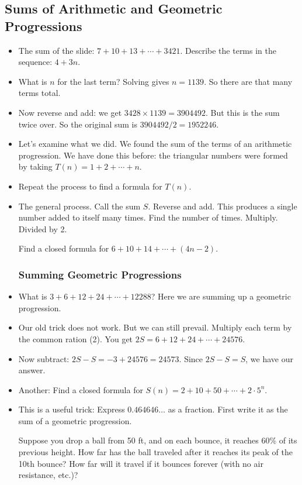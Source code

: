 \subsection*{Sums of Arithmetic and Geometric Progressions}
\begin{itemize}
\item The sum of the slide: $7 + 10 + 13 + \cdots + 3421$.  Describe the terms in the sequence: $4 + 3n$.  
\item What is $n$ for the last term?  Solving gives $n = 1139$.  So there are that many terms total.  
\item Now reverse and add: we get $3428\times 1139 = 3904492$.  But this is the sum twice over.  So the original sum is $3904492/2 = 1952246$.
\item Let's examine what we did.  We found the sum of the terms of an arithmetic progression.  We have done this before: the triangular numbers were formed by taking $T(n) = 1 + 2 + \cdots + n$.
\item Repeat the process to find a formula for $T(n)$.  
\item The general process.  Call the sum $S$.  Reverse and add.  This produces a single number added to itself many times.  Find the number of times.  Multiply.  Divided by 2.

 Find a closed formula for $6 + 10 + 14 + \cdots + (4n - 2)$.

\subsubsection*{Summing Geometric Progressions}

\item What is $3 + 6 + 12 + 24 + \cdots + 12288$?  Here we are summing up a geometric progression.
\item Our old trick does not work.  But we can still prevail.  Multiply each term by the common ration (2).  You get $2S = 6 + 12 + 24 + \cdots + 24576$.  
\item Now subtract: $2S - S = -3 + 24576 = 24573$.  Since $2S - S = S$, we have our answer.
\item Another: Find a closed formula for $S(n) = 2 + 10 + 50 + \cdots + 2\cdot 5^n$.
\item This is a useful trick: Express $0.464646\ldots$ as a fraction.  First write it as the sum of a geometric progression.

 Suppose you drop a ball from 50 ft, and on each bounce, it reaches 60\% of its previous height.  How far has the ball traveled after it reaches its peak of the 10th bounce?  How far will it travel if it bounces forever (with no air resistance, etc.)?


\end{itemize}
